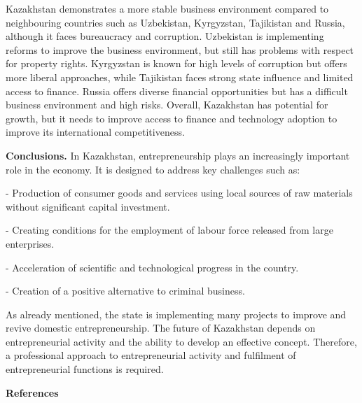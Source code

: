 \begin{multicols}{2}
Kazakhstan demonstrates a more stable business environment compared to
neighbouring countries such as Uzbekistan, Kyrgyzstan, Tajikistan and
Russia, although it faces bureaucracy and corruption. Uzbekistan is
implementing reforms to improve the business environment, but still has
problems with respect for property rights. Kyrgyzstan is known for high
levels of corruption but offers more liberal approaches, while
Tajikistan faces strong state influence and limited access to finance.
Russia offers diverse financial opportunities but has a difficult
business environment and high risks. Overall, Kazakhstan has potential
for growth, but it needs to improve access to finance and technology
adoption to improve its international competitiveness.

{\bfseries Conclusions.} In Kazakhstan, entrepreneurship plays an
increasingly important role in the economy. It is designed to address
key challenges such as:

- Production of consumer goods and services using local sources of raw
materials without significant capital investment.

- Creating conditions for the employment of labour force released from
large enterprises.

- Acceleration of scientific and technological progress in the country.

- Creation of a positive alternative to criminal business.

As already mentioned, the state is implementing many projects to improve
and revive domestic entrepreneurship. The future of Kazakhstan depends
on entrepreneurial activity and the ability to develop an effective
concept. Therefore, a professional approach to entrepreneurial activity
and fulfilment of entrepreneurial functions is required.
\end{multicols}

\begin{center}
{\bfseries References}
\end{center}

